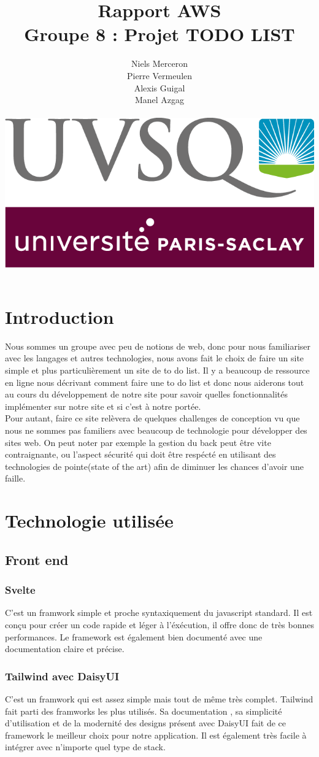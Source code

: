 \documentclass[a4paper,12pt]{report}
\date{}
\title{Rapport AWS \\ Groupe 8 : Projet TODO LIST}
\author{Niels Merceron \\ Pierre Vermeulen \\ Alexis Guigal \\ Manel Azgag \\ \\  \includegraphics[scale=0.20]{logo-UVSQ-2020-RVB.png}}
\begin{document}
\maketitle

\newpage
\tableofcontents
\chapter{Introduction}

Nous sommes un groupe avec peu de notions de web, donc pour nous familiariser avec les langages et autres technologies, nous avons fait le choix de faire un site simple et plus particulièrement un site de to do list.
Il y a beaucoup de ressource en ligne nous décrivant comment faire une to do list et donc nous aiderons tout au cours du développement de notre site pour savoir quelles fonctionnalités implémenter sur notre site et si c'est à notre portée.
\\Pour autant, faire ce site relèvera de quelques challenges de conception vu que nous ne sommes pas familiers avec beaucoup de technologie pour développer des sites web.
On peut noter par exemple la gestion du back peut être vite contraignante, ou l'aspect sécurité qui doit être respécté en utilisant des technologies de pointe(state of the art) afin de diminuer les chances d'avoir une faille.


\chapter{Technologie utilisée}
\section{Front end}

\subsection{Svelte}
C'est un framwork simple et proche syntaxiquement du javascript standard. Il est conçu pour créer un code rapide et léger à l'éxécution, il offre donc de très bonnes performances. 
Le framework est également bien documenté avec une documentation claire et précise.

\subsection{Tailwind avec DaisyUI}
C'est un framwork qui est assez simple mais tout de même très complet. Tailwind fait parti des framworks les plus utilisés. 
Sa documentation , sa simplicité d'utilisation et de la modernité des designs présent avec DaisyUI fait de ce framework le meilleur choix pour notre application.
Il est également très facile à intégrer avec n'importe quel type de stack.
\end{document}
